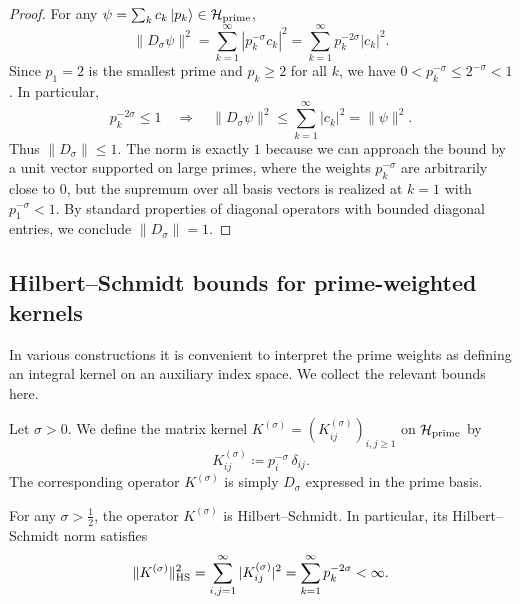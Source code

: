 \documentclass[11pt]{article}
\begin{document}
\begin{proof}
For any \(\psi = \sum_{k} c_k \ket{p_k} \in \mathcal{H}_{\rm prime}\),
\begin{equation}
  \|D_\sigma \psi\|^2
  = \sum_{k=1}^{\infty} |p_k^{-\sigma} c_k|^2
  = \sum_{k=1}^\infty p_k^{-2\sigma} |c_k|^2.
\end{equation}
Since \(p_1 = 2\) is the smallest prime and \(p_k \ge 2\) for all \(k\),
we have \(0 < p_k^{-\sigma} \le 2^{-\sigma} < 1\). In particular,
\begin{equation}
  p_k^{-2\sigma} \le 1
  \quad\Rightarrow\quad
  \|D_\sigma \psi\|^2 \le \sum_{k=1}^{\infty} |c_k|^2 = \|\psi\|^2.
\end{equation}
Thus \(\|D_\sigma\|\le 1\). The norm is exactly \(1\) because we can
approach the bound by a unit vector supported on large primes, where the
weights \(p_k^{-\sigma}\) are arbitrarily close to \(0\), but the
supremum over all basis vectors is realized at \(k=1\) with
\(p_1^{-\sigma}<1\). By standard properties of diagonal operators with
bounded diagonal entries, we conclude \(\|D_\sigma\|=1\).
\end{proof}

\subsection{Hilbert--Schmidt bounds for prime-weighted kernels}

In various constructions it is convenient to interpret the prime
weights as defining an integral kernel on an auxiliary index space.
We collect the relevant bounds here.

\begin{definition}
Let \(\sigma>0\). We define the matrix kernel
\(K^{(\sigma)} = (K_{ij}^{(\sigma)})_{i,j\ge 1}\) on
\(\mathcal{H}_{\rm prime}\) by
\begin{equation}
  K_{ij}^{(\sigma)} \coloneqq p_i^{-\sigma}\,\delta_{ij}.
\end{equation}
The corresponding operator \(K^{(\sigma)}\) is simply \(D_\sigma\)
expressed in the prime basis.
\end{definition}

\begin{lemma}
For any \(\sigma > \tfrac{1}{2}\), the operator \(K^{(\sigma)}\) is
Hilbert--Schmidt. In particular, its Hilbert--Schmidt norm satisfies
\begin{equation}
  \|K^{(\sigma)}\|_{\rm HS}^2
  = \sum_{i,j=1}^{\infty} |K_{ij}^{(\sigma)}|^2
  = \sum_{k=1}^{\infty} p_k^{-2\sigma} < \infty.
\end{equation}
\end{lemma}
\end{document}
